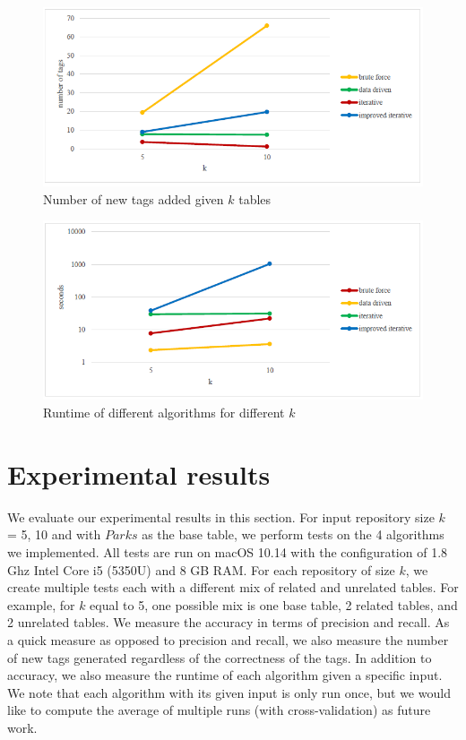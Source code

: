 \begin{figure}
    \centering
    \includegraphics[width=5in]{figures/number-of-new-tags-added-given-k-tables.png}
    \caption{Number of new tags added given $k$ tables}
    \label{fig:number-of-new-tags-added-given-k-tables}
\end{figure}

\begin{figure}
    \centering
    \includegraphics[width=5in]{figures/runtime-of-different-algorithms-for-different-k.png}
    \caption{Runtime of different algorithms for different $k$}
    \label{fig:runtime-of-different-algorithms-for-different-k}
\end{figure}
\section{Experimental results}
\label{sec:ExperimentalResults}

We evaluate our experimental results in this section. For input repository size $k$ = 5, 10 and with $Parks$ as the base table, we perform tests on the 4 algorithms we implemented. All tests are run on macOS 10.14 with the configuration of 1.8 Ghz Intel Core i5 (5350U) and 8 GB RAM. For each repository of size $k$, we create multiple tests each with a different mix of related and unrelated tables. For example, for $k$ equal to 5, one possible mix is one base table, 2 related tables, and 2 unrelated tables. We measure the accuracy in terms of precision and recall. As a quick measure as opposed to precision and recall, we also measure the number of new tags generated regardless of the correctness of the tags. In addition to accuracy, we also measure the runtime of each algorithm given a specific input. We note that each algorithm with its given input is only run once, but we would like to compute the average of multiple runs (with cross-validation) as future work.

